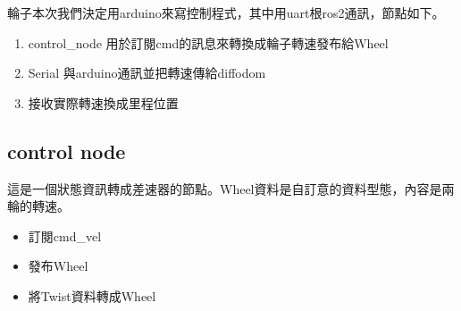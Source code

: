 輪子本次我們決定用arduino來寫控制程式，其中用uart根ros2通訊，節點如下。
\begin{enumerate}
    \item control\_node 用於訂閱cmd的訊息來轉換成輪子轉速發布給Wheel
    \item Serial 與arduino通訊並把轉速傳給diffodom 
    \item 接收實際轉速換成里程位置
\end{enumerate}

\subsection{control node}
這是一個狀態資訊轉成差速器的節點。Wheel資料是自訂意的資料型態，內容是兩輪的轉速。
\begin{itemize}
    \item 訂閱cmd\_vel
    \item 發布Wheel
    \item 將Twist資料轉成Wheel
\end{itemize}


